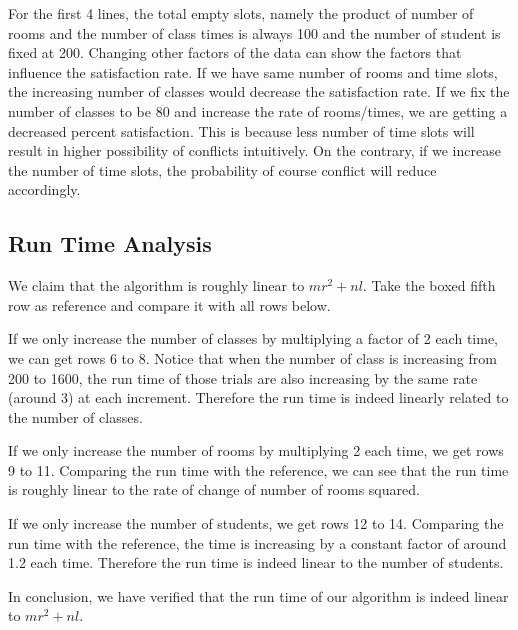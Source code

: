 \documentclass[11pt, oneside]{article}   	%
\begin{document}
For the first 4 lines, the total empty slots, namely the product of number of rooms and the number of class times is always 100 and the number of student is fixed at 200. Changing other factors of the data can show the factors that influence the satisfaction rate. If we have same number of rooms and time slots, the increasing number of classes would decrease the satisfaction rate. If we fix the number of classes to be 80 and increase the rate of rooms/times, we are getting a decreased percent satisfaction. This is because less number of time slots will result in higher possibility of conflicts intuitively. On the contrary, if we increase the number of time slots, the probability of course conflict will reduce accordingly.
\subsection{Run Time Analysis}
We claim that the algorithm is roughly linear to $mr^2 + nl$. Take the boxed fifth row as reference and compare it with all rows below.

If we only increase the number of classes by multiplying a factor of 2 each time, we can get rows 6 to 8. Notice that when the number of class is increasing from 200 to 1600, the run time of those trials are also increasing by the same rate (around 3) at each increment. Therefore the run time is indeed linearly related to the number of classes.

If we only increase the number of rooms by multiplying 2 each time, we get rows 9 to 11. Comparing the run time with the reference, we can see that the run time is roughly linear to the rate of change of number of rooms squared.

If we only increase the number of students, we get rows 12 to 14. Comparing the run time with the reference, the time is increasing by a constant factor of around 1.2 each time. Therefore the run time is indeed linear to the number of students.

In conclusion, we have verified that the run time of our algorithm is indeed linear to $mr^2 + nl$.

\end{document}
